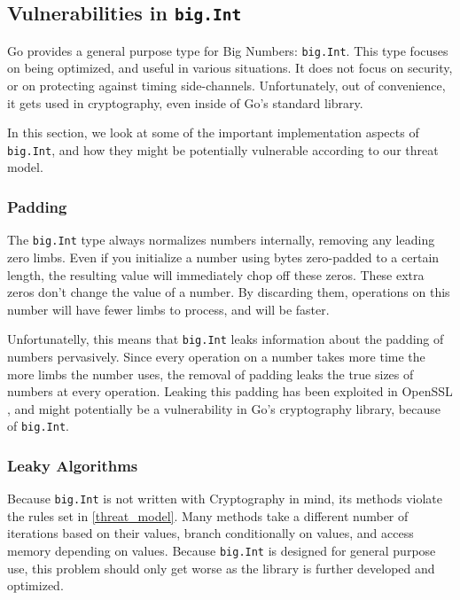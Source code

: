 \documentclass[11pt, a4paper]{article} %
\begin{document}
{\subsection{Vulnerabilities in \texttt{big.Int}}

Go provides a general purpose type for Big Numbers: \texttt{big.Int}.
This type focuses on being optimized, and useful in various
situations. It does not focus on security, or on protecting
against timing side-channels.
Unfortunately, out of convenience, it gets used in
cryptography, even inside of Go's standard library.

In this section, we look at some of the important implementation aspects
of \texttt{big.Int}, and how they might be potentially vulnerable
according to our threat model.

\subsubsection{Padding}

The \texttt{big.Int} type always normalizes numbers internally,
removing any leading zero limbs. Even if you initialize a number
using bytes zero-padded to a certain length, the resulting value
will immediately chop off these zeros. These extra zeros don't
change the value of a number. By discarding them, operations on
this number will have fewer limbs to process, and will be faster.

Unfortunatelly, this means that \texttt{big.Int} leaks information
about the padding of numbers pervasively. Since every operation on
a number takes more time the more limbs the number uses,
the removal of padding leaks the true sizes of numbers
at every operation.
Leaking this padding has been exploited
in OpenSSL \cite{merget_raccoon_2019}, and might potentially
be a vulnerability in Go's cryptography library, because of \texttt{big.Int}.

\subsubsection{Leaky Algorithms}

Because \texttt{big.Int} is not written with Cryptography in mind,
its methods violate the rules set in
\ref{threat_model}. Many methods take a different number of iterations
based on their values, branch conditionally on values, and
access memory depending on values. Because \texttt{big.Int}
is designed for general purpose use, this problem should only get worse
as the library is further developed and optimized.

}
\end{document}
